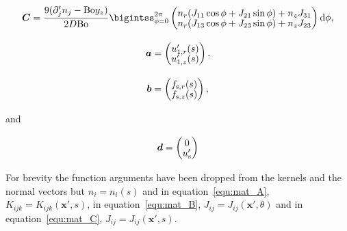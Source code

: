 \documentclass[12pt]{article}
\begin{document}
\begin{equation}
\setlength{\arraycolsep}{5pt}
\renewcommand{\arraystretch}{1.3}
\boldsymbol{C} = \frac{9(\partial'_{j} n_{j} - \text{Bo} y_{z})}{2 D \text{Bo}} \bigintss_{\phi = 0}^{2 \pi} \left( \begin{matrix}
n_{r} (J_{11} \cos\phi + J_{21} \sin\phi) + n_{z} J_{31} \\[-5pt]
n_{r} (J_{13} \cos\phi + J_{23} \sin\phi) + n_{z} J_{23} \\
\end{matrix} \right) \mathrm{d}\phi ,
\label{equ:mat_C}
\end{equation}


\begin{equation}
\setlength{\arraycolsep}{5pt}
\renewcommand{\arraystretch}{1.3}
\boldsymbol{a} = \left( \begin{matrix}
u'_{1,r}(s) \\[-5pt]
u'_{1,z}(s) \\
\end{matrix} \right),
\label{equ:vec_a}
\end{equation}


\begin{equation}
\setlength{\arraycolsep}{5pt}
\renewcommand{\arraystretch}{1.3}
\boldsymbol{b} = \left( \begin{matrix}
f_{\text{s},r}(s) \\[-5pt]
f_{\text{s},z}(s) \\
\end{matrix} \right)  ,
\label{equ:vec_b}
\end{equation}

and 

\begin{equation}
\setlength{\arraycolsep}{5pt}
\renewcommand{\arraystretch}{1.3}
\boldsymbol{d} = \left( \begin{matrix}
0 \\[-5pt]
u'_{\text{s}} \\
\end{matrix} \right) 
\label{equ:vec_d}
\end{equation}

For brevity the function arguments have been dropped from the kernels and the normal vectors but $n_{i} = n_{i}(s)$ and in equation~\ref{equ:mat_A}, $K_{ijk} = K_{ijk}(\boldsymbol{x'},s)$, in equation~\ref{equ:mat_B}, $J_{ij} = J_{ij}(\boldsymbol{x'},\theta)$ and in equation~\ref{equ:mat_C}, $J_{ij} = J_{ij}(\boldsymbol{x'},s)$.
\appendix
\end{document}
